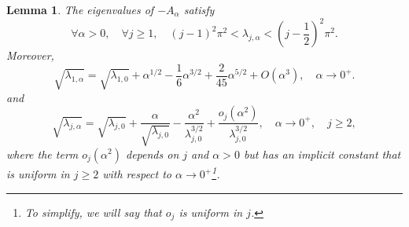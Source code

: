 \documentclass[10pt]{article}
\newtheorem{Lemma}[Theorem]{Lemma}
\begin{document}
\begin{Lemma}\label{lem:spectral_asymp}
The eigenvalues of $-A_\alpha$ satisfy 
\begin{equation}\label{eq:spectral_genuine}
\forall \alpha > 0,\quad \forall j \geq 1,\quad (j-1)^2\pi^2 < \lambda_{j,\alpha} < \left( j - \frac{1}{2}\right)^2 \pi^2.
\end{equation}
Moreover,
\[
 \sqrt{\lambda_{1,\alpha}} = \sqrt{\lambda_{1,0}} + \alpha^{1/2} - \frac{1}{6} \alpha^{3/2} + \frac{2}{45} \alpha^{5/2} +  O(\alpha^3),\quad \alpha \to 0^+.
 \]
and 
\[
\sqrt{\lambda_{j,\alpha}} = \sqrt{\lambda_{j,0}} + \frac{\alpha}{\sqrt{\lambda_{j,0}}} - \frac{\alpha^2}{\lambda_{j,0}^{3/2}} + \frac{o_j(\alpha^2)}{\lambda_{j,0}^{3/2}}, \quad \alpha \to 0^+,\quad j \geq 2,
\]
where the term $o_j(\alpha^2)$ depends on $j$ and $\alpha > 0$ but has an implicit constant that is uniform in $j \geq 2$ with respect to $\alpha \to 0^+$\footnote{To simplify, we will say that $o_j$ is uniform in $j$.}. 
\end{Lemma}
\end{document}
